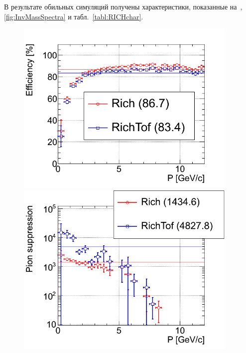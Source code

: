 В результате обильных симуляций получены характеристики, показанные на~, \ref{fig:InvMassSpectra} и табл.~\ref{tabl:RICHchar}.

\begin{figure}[H]
\begin{minipage}[t]{0.495\textwidth}
\includegraphics[width=0.95\textwidth]{pictures/RICHeff1.png}
\end{minipage}
\begin{minipage}[t]{0.495\textwidth}
\includegraphics[width=0.95\textwidth]{pictures/RICHeff2.png}
\end{minipage}
\begin{minipage}[t]{0.495\textwidth}

\end{minipage}
\end{figure}
